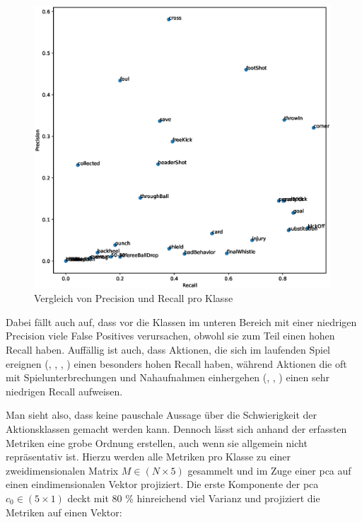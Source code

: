 \begin{figure}
    \centering
    \includegraphics[width=0.99\textwidth, keepaspectratio, interpolate]{img/07_precision_recall_by_class.eps}
    \caption{Vergleich von Precision und Recall pro Klasse}
    \label{fig:precision-recall}
\end{figure}

Dabei fällt auch auf, dass vor die Klassen im unteren Bereich mit einer niedrigen Precision viele False Positives verursachen, obwohl sie zum Teil einen hohen Recall haben.
Auffällig ist auch, dass Aktionen, die sich im laufenden Spiel ereignen (, , , ) einen besonders hohen Recall haben, während Aktionen die oft mit Spielunterbrechungen und Nahaufnahmen einhergehen (, , ) einen sehr niedrigen Recall aufweisen.

Man sieht also, dass keine pauschale Aussage über die Schwierigkeit der Aktionsklassen gemacht werden kann.
Dennoch lässt sich anhand der erfassten Metriken eine grobe Ordnung erstellen, auch wenn sie allgemein nicht repräsentativ ist.
Hierzu werden alle Metriken pro Klasse zu einer zweidimensionalen Matrix $M \in (N \times 5)$ gesammelt und im Zuge einer \gls{pca} auf einen eindimensionalen Vektor projiziert.
Die erste Komponente der \gls{pca} $c_0 \in (5 \times 1)$ deckt mit 80 \% hinreichend viel Varianz und projiziert die Metriken auf einen Vektor:

